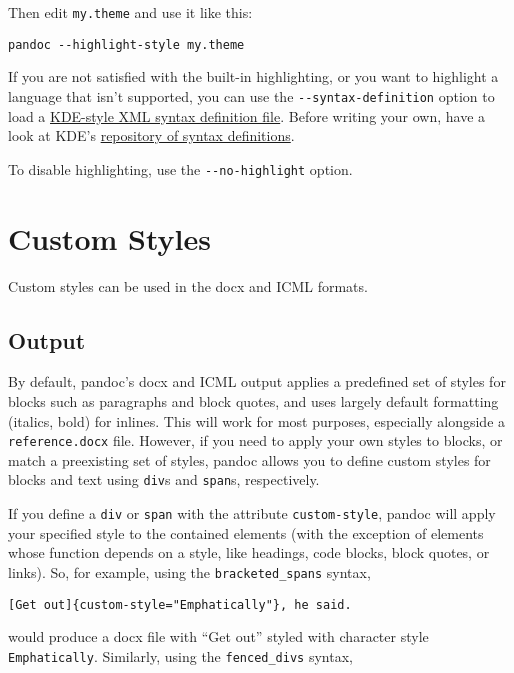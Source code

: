 \documentclass[
]{article}
\begin{document}
Then edit \texttt{my.theme} and use it like this:

\begin{verbatim}
pandoc --highlight-style my.theme
\end{verbatim}

If you are not satisfied with the built-in highlighting, or you want to
highlight a language that isn't supported, you can use the
\texttt{-\/-syntax-definition} option to load a
\href{https://docs.kde.org/stable5/en/kate/katepart/highlight.html}{KDE-style
XML syntax definition file}. Before writing your own, have a look at
KDE's
\href{https://github.com/KDE/syntax-highlighting/tree/master/data/syntax}{repository
of syntax definitions}.

To disable highlighting, use the \texttt{-\/-no-highlight} option.

\section{Custom Styles}\label{custom-styles}

Custom styles can be used in the docx and ICML formats.

\subsection{Output}\label{output}

By default, pandoc's docx and ICML output applies a predefined set of
styles for blocks such as paragraphs and block quotes, and uses largely
default formatting (italics, bold) for inlines. This will work for most
purposes, especially alongside a \texttt{reference.docx} file. However,
if you need to apply your own styles to blocks, or match a preexisting
set of styles, pandoc allows you to define custom styles for blocks and
text using \texttt{div}s and \texttt{span}s, respectively.

If you define a \texttt{div} or \texttt{span} with the attribute
\texttt{custom-style}, pandoc will apply your specified style to the
contained elements (with the exception of elements whose function
depends on a style, like headings, code blocks, block quotes, or links).
So, for example, using the \texttt{bracketed\_spans} syntax,

\begin{verbatim}
[Get out]{custom-style="Emphatically"}, he said.
\end{verbatim}

would produce a docx file with ``Get out'' styled with character style
\texttt{Emphatically}. Similarly, using the \texttt{fenced\_divs}
syntax,
\end{document}
